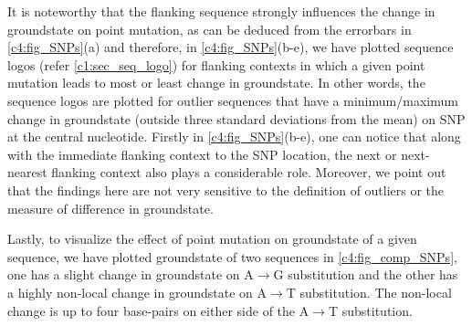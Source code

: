 It is noteworthy that the flanking sequence strongly influences the change in groundstate on point mutation, as can be deduced from the errorbars in \cref{c4:fig_SNPs}(a) and therefore, in \cref{c4:fig_SNPs}(b-e), we have plotted sequence logos (refer \cref{c1:sec_seq_logo}) for flanking contexts in which a given point mutation leads to most or least change in groundstate.
In other words, the sequence logos are plotted for outlier sequences that have a minimum/maximum change in groundstate (outside three standard deviations from the mean) on SNP at the central nucleotide.
Firstly in \cref{c4:fig_SNPs}(b-e), one can notice that along with the immediate flanking context to the SNP location, the next or next-nearest flanking context also plays a considerable role.
Moreover, we point out that the findings here are not very sensitive to the definition of outliers or the measure of difference in groundstate.

Lastly, to visualize the effect of point mutation on groundstate of a given sequence, we have plotted groundstate of two sequences in \cref{c4:fig_comp_SNPs}, one has a slight change in groundstate on A$\longrightarrow$G substitution and the other has a highly non-local change in groundstate on A$\longrightarrow$T substitution.
The non-local change is up to four base-pairs on either side of the A$\longrightarrow$T substitution. 
\clearpage
